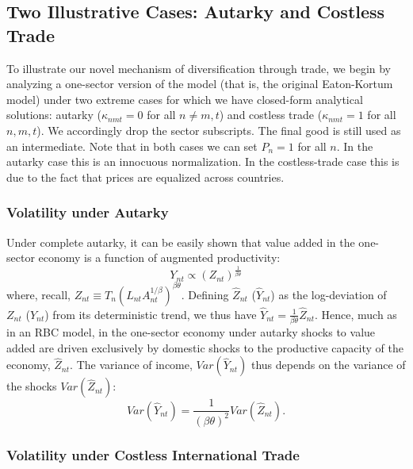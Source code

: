\documentclass[12pt]{article}
\begin{document}
\subsection{Two Illustrative Cases: Autarky and Costless Trade}

To illustrate our novel mechanism of diversification through trade, we begin
by analyzing a one-sector version of the model (that is, the original
Eaton-Kortum model) under two extreme cases for which we have closed-form
analytical solutions: autarky ($\kappa _{nmt}=0$ for all $n\neq m,t$) and
costless trade ($\kappa _{nmt}=1$ for all $n,m,t$). We accordingly drop the
sector subscripts. The final good is still used as an intermediate. Note
that in both cases we can set $P_{n}=1$ for all $n$. In the autarky case
this is an innocuous normalization. In the costless-trade case this is due
to the fact that prices are equalized across countries.

\subsubsection{Volatility under Autarky}

Under complete autarky, it can be easily shown that value added in the
one-sector economy is a function of augmented productivity: 
\begin{equation*}
Y_{nt}\propto \left( Z_{nt}\right) ^{\frac{1}{\beta \theta }}
\end{equation*}%
where, recall, $Z_{nt}\equiv T_{n}\left( L_{nt}A_{nt}^{1/\beta }\right)
^{\beta \theta }$. Defining $\hat{Z}_{nt}$ ($\hat{Y}_{nt}$) as the
log-deviation of $Z_{nt}$ ($Y_{nt}$) from its deterministic trend, we thus
have $\hat{Y}_{nt}=\frac{1}{\beta \theta }\hat{Z}_{nt}.$ Hence, much as in an
RBC model, in the one-sector economy under autarky shocks to value added are
driven exclusively by domestic shocks to the productive capacity of the
economy, $\hat{Z}_{nt}.$ The variance of income, $Var(\hat{Y}_{nt})$ thus
depends on the variance of the shocks $Var(\hat{Z}_{nt})$: 
\begin{equation*}
Var(\hat{Y}_{nt})=\frac{1}{\left( \beta \theta \right) ^{2}}Var(\hat{Z}%
_{nt}).
\end{equation*}

\subsubsection{Volatility under Costless International Trade}
\end{document}

